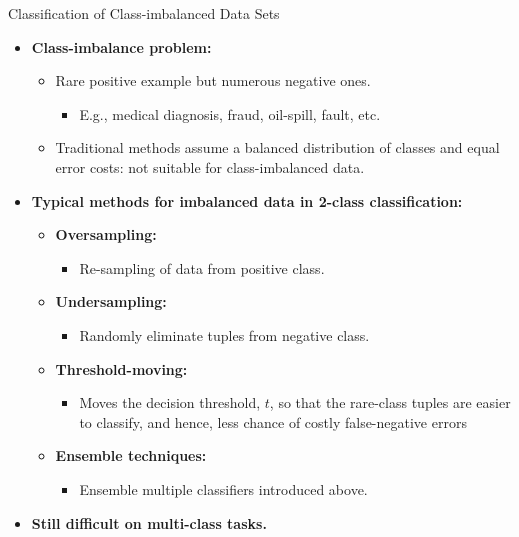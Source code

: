 \begin{frame}{Classification of Class-imbalanced Data Sets}
  \begin{itemize}
  \item \textbf{Class-imbalance problem:}
    \begin{itemize}
    \item Rare positive example but numerous negative ones.
      \begin{itemize}
      \item E.g., medical diagnosis, fraud, oil-spill, fault, etc.
      \end{itemize}
    \item Traditional methods assume a balanced distribution of classes and equal error costs: not suitable for class-imbalanced data.
    \end{itemize}
  \item \textbf{Typical methods for imbalanced data in 2-class classification:}
    \begin{itemize}
    \item \textbf{\color{airforceblue}Oversampling:}
      \begin{itemize}
      \item Re-sampling of data from positive class.
      \end{itemize}
    \item \textbf{\color{airforceblue}Undersampling:}
      \begin{itemize}
      \item Randomly eliminate tuples from negative class.
      \end{itemize}
    \item \textbf{\color{airforceblue}Threshold-moving:}
      \begin{itemize}
      \item Moves the decision threshold, $t$, so that the rare-class tuples are easier to classify, and hence, less chance of costly false-negative errors
      \end{itemize}
    \item \textbf{\color{airforceblue}Ensemble techniques:}
      \begin{itemize}
      \item Ensemble multiple classifiers introduced above.
      \end{itemize}
    \end{itemize}
  \item \textbf{Still difficult on multi-class tasks.}
  \end{itemize}
\end{frame}
